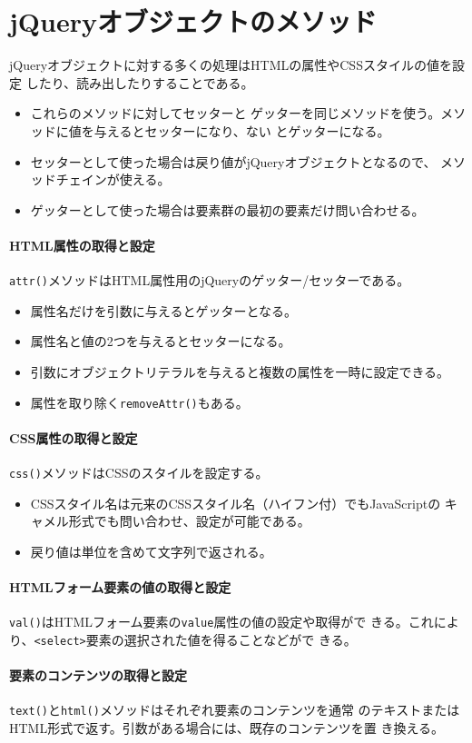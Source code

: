 \section{jQueryオブジェクトのメソッド}
jQueryオブジェクトに対する多くの処理はHTMLの属性やCSSスタイルの値を設定
したり、読み出したりすることである。
\begin{itemize}
 \item これらのメソッドに対してセッターと
ゲッターを同じメソッドを使う。メソッドに値を与えるとセッターになり、ない
とゲッターになる。
 \item セッターとして使った場合は戻り値がjQueryオブジェクトとなるので、
       メソッドチェインが使える。
 \item ゲッターとして使った場合は要素群の最初の要素だけ問い合わせる。
\end{itemize}
\paragraph{HTML属性の取得と設定}
\texttt{attr()}メソッドはHTML属性用のjQueryのゲッター/セッターである。
\begin{itemize}
 \item 属性名だけを引数に与えるとゲッターとなる。
 \item 属性名と値の2つを与えるとセッターになる。
 \item 引数にオブジェクトリテラルを与えると複数の属性を一時に設定できる。
 \item 属性を取り除く\texttt{removeAttr()}もある。
\end{itemize}
\paragraph{CSS属性の取得と設定}
\texttt{css()}メソッドはCSSのスタイルを設定する。
\begin{itemize}
 \item CSSスタイル名は元来のCSSスタイル名（ハイフン付）でもJavaScriptの
       キャメル形式でも問い合わせ、設定が可能である。
 \item 戻り値は単位を含めて文字列で返される。
\end{itemize}
\paragraph{HTMLフォーム要素の値の取得と設定}
\texttt{val()}はHTMLフォーム要素の\texttt{value}属性の値の設定や取得がで
きる。これにより、\texttt{<select>}要素の選択された値を得ることなどがで
きる。
\paragraph{要素のコンテンツの取得と設定}
\texttt{text()}と\texttt{html()}メソッドはそれぞれ要素のコンテンツを通常
のテキストまたはHTML形式で返す。引数がある場合には、既存のコンテンツを置
き換える。
